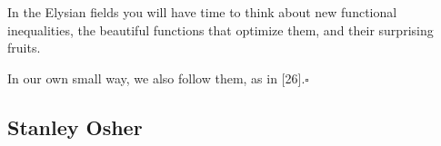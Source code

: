 \documentclass{article}
\begin{document}
In the Elysian fields you will have time to think about new functional inequalities, the beautiful functions that optimize them, and their surprising fruits.

In our own small way, we also follow them, as in [26].\hfill$\square$



\subsection{Stanley Osher}


\end{document}
